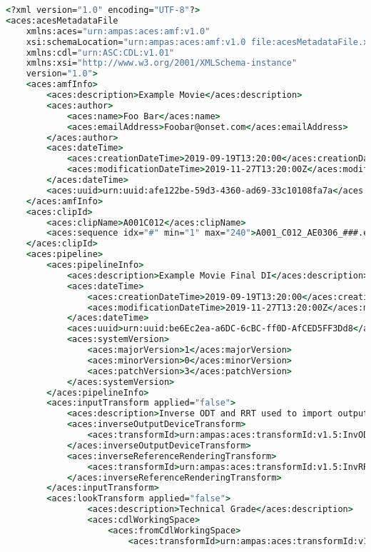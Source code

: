 \begin{lstlisting}[language=csh]
<?xml version="1.0" encoding="UTF-8"?>
<aces:acesMetadataFile 
    xmlns:aces="urn:ampas:aces:amf:v1.0"
    xsi:schemaLocation="urn:ampas:aces:amf:v1.0 file:acesMetadataFile.xsd"
    xmlns:cdl="urn:ASC:CDL:v1.01"
    xmlns:xsi="http://www.w3.org/2001/XMLSchema-instance"
    version="1.0">
    <aces:amfInfo>
        <aces:description>Example Movie</aces:description>
        <aces:author>
            <aces:name>Foo Bar</aces:name>
            <aces:emailAddress>Foobar@onset.com</aces:emailAddress>
        </aces:author>
        <aces:dateTime>
            <aces:creationDateTime>2019-09-19T13:20:00</aces:creationDateTime>
            <aces:modificationDateTime>2019-11-27T13:20:00Z</aces:modificationDateTime>
        </aces:dateTime>
        <aces:uuid>urn:uuid:afe122be-59d3-4360-ad69-33c10108fa7a</aces:uuid>
    </aces:amfInfo>
    <aces:clipId>
        <aces:clipName>A001C012</aces:clipName>
        <aces:sequence idx="#" min="1" max="240">A001_C012_AE0306_###.exr</aces:sequence>
    </aces:clipId>
    <aces:pipeline>
        <aces:pipelineInfo>
            <aces:description>Example Movie Final DI</aces:description>
            <aces:dateTime>
                <aces:creationDateTime>2019-09-19T13:20:00</aces:creationDateTime>
                <aces:modificationDateTime>2019-11-27T13:20:00Z</aces:modificationDateTime>
            </aces:dateTime>
            <aces:uuid>urn:uuid:be6Ec2ea-a6DC-6cBC-ff0D-AfCED5FF3Dd8</aces:uuid>
            <aces:systemVersion>
                <aces:majorVersion>1</aces:majorVersion>
                <aces:minorVersion>0</aces:minorVersion>
                <aces:patchVersion>3</aces:patchVersion>
            </aces:systemVersion>
        </aces:pipelineInfo>
        <aces:inputTransform applied="false">
            <aces:description>Inverse ODT and RRT used to import output referred data</aces:description>
            <aces:inverseOutputDeviceTransform>
                <aces:transformId>urn:ampas:aces:transformId:v1.5:InvODT.Academy.Rec709_100nits_dim.a1.0.3</aces:transformId>
            </aces:inverseOutputDeviceTransform>
            <aces:inverseReferenceRenderingTransform>
                <aces:transformId>urn:ampas:aces:transformId:v1.5:InvRRT.a1.0.3</aces:transformId>
            </aces:inverseReferenceRenderingTransform>
        </aces:inputTransform>
        <aces:lookTransform applied="false">
                <aces:description>Technical Grade</aces:description>
                <aces:cdlWorkingSpace>
                    <aces:fromCdlWorkingSpace>
                        <aces:transformId>urn:ampas:aces:transformId:v1.5:ACEScsc.Academy.ACEScct_to_ACES.a1.0.3</aces:transformId>

\end{lstlisting}
